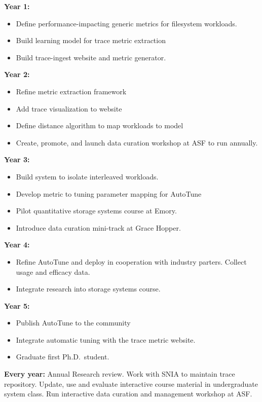 \noindent
\textbf{Year 1:} 
\begin{itemize}
\item Define performance-impacting generic metrics for filesystem workloads.
\item Build learning model for trace metric extraction
\item Build trace-ingest website and metric generator.
\end{itemize}
\noindent
\textbf{Year 2:} 
\begin{itemize}
\item Refine metric extraction framework
\item Add trace visualization to website
\item Define distance algorithm to map workloads to model
\item Create, promote, and launch data curation workshop at ASF to run annually.
\end{itemize}

\noindent
\textbf{Year 3:}
\begin{itemize}
\item Build system to isolate interleaved workloads.
\item Develop metric to tuning parameter mapping for AutoTune  
\item Pilot quantitative storage systems course at Emory.
\item Introduce data curation mini-track at Grace Hopper.
%
\end{itemize}
\noindent
\textbf{Year 4:} 
%
\begin{itemize}
\item Refine AutoTune and deploy in cooperation with industry parters.  Collect usage and efficacy data.
\item Integrate research into storage systems course. 
\end{itemize}
\noindent
\textbf{Year 5:} 
\begin{itemize}
\item Publish AutoTune to the community
\item Integrate automatic tuning with the trace metric website.
\item Graduate first Ph.D.~student.
\end{itemize}

\noindent
\textbf{Every year:} Annual Research review.  Work with SNIA to maintain trace
repository.
Update, use and evaluate interactive course material in undergraduate system
class.  Run interactive data curation and management workshop at ASF. %


